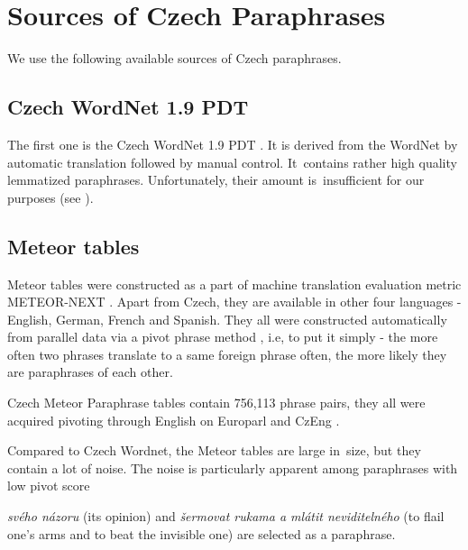 \section{Sources of Czech Paraphrases}
We use the following available sources of Czech paraphrases.

\subsection{Czech WordNet 1.9 PDT}
The first one is the Czech WordNet 1.9 PDT \citep{czech-wordnet}. It is derived 
from the WordNet \cite{wordnet} by automatic translation followed by manual 
control. It~contains rather high quality lemmatized paraphrases. Unfortunately, 
their amount is~insufficient for our purposes (see ). 


\subsection{Meteor tables} %
\label{meteori}
Meteor tables were constructed as a part of machine translation evaluation 
metric METEOR-NEXT \citep{meteor-tables}. Apart from Czech, they are available 
in other four languages - English, German, French and Spanish. 
They all were constructed automatically from parallel data via a pivot phrase 
method \citep{pivoting}, i.e, to put it simply -  the more often two phrases 
translate to a same foreign phrase often, the more likely they are paraphrases 
of each other.

Czech Meteor Paraphrase tables contain 756,113 phrase 
pairs, they all were acquired pivoting through English on Europarl and CzEng 
\citep{czeng}.

Compared to Czech Wordnet, the Meteor tables are large in~size, but they 
contain a lot of noise. The noise is particularly apparent among paraphrases 
with low pivot score

\textit{svého názoru}  (its opinion) and \textit{šermovat rukama a 
mlátit neviditelného} (to flail one's arms and to beat the invisible one) are 
selected as a paraphrase. 

